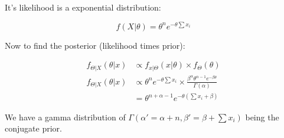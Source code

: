 \documentclass[11pt]{article}
\begin{document}
It's likelihood is a exponential distribution:

\begin{equation*}
    f(X|\theta) = \theta^n e^{-\theta \sum x_i}
\end{equation*}

Now to find the posterior (likelihood times prior):

\begin{align*}
    f_{\Theta | X}(\theta | x) &\propto f_{x|\Theta}(x|\theta)\times f_\Theta(\theta) \\
    f_{\Theta | X}(\theta | x) &\propto \theta^n e^{-\theta \sum x_i} \times \frac{\beta^\alpha\theta^{\alpha - 1}e^{-\beta\theta}}{\Gamma(\alpha)} \\
    &= \theta^{n + \alpha - 1}e^{-\theta(\sum x_i + \beta)}
\end{align*}

We have a gamma distribution of $\Gamma( \alpha' = \alpha + n, \beta' = \beta + \sum x_i )$ being the conjugate prior.
\end{document}
